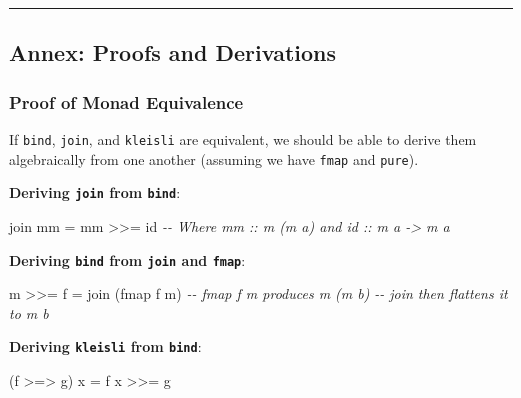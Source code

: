 \documentclass[
]{article}
\newenvironment{Shaded}{}{}
\newcommand{\CommentTok}[1]{\textcolor[rgb]{0.38,0.63,0.69}{\textit{#1}}}
\newcommand{\FunctionTok}[1]{\textcolor[rgb]{0.02,0.16,0.49}{#1}}
\newcommand{\NormalTok}[1]{#1}
\newcommand{\OperatorTok}[1]{\textcolor[rgb]{0.40,0.40,0.40}{#1}}
\newcommand{\OtherTok}[1]{\textcolor[rgb]{0.00,0.44,0.13}{#1}}
\begin{document}
\begin{center}\rule{0.5\linewidth}{0.5pt}\end{center}

\subsection{Annex: Proofs and
Derivations}\label{annex-proofs-and-derivations}

\subsubsection{Proof of Monad
Equivalence}\label{proof-of-monad-equivalence}

If \texttt{bind}, \texttt{join}, and \texttt{kleisli} are equivalent, we
should be able to derive them algebraically from one another (assuming
we have \texttt{fmap} and \texttt{pure}).

\textbf{Deriving \texttt{join} from \texttt{bind}}:

\begin{Shaded}
\begin{Highlighting}[]
\NormalTok{join mm }\OtherTok{=}\NormalTok{ mm }\OperatorTok{\textgreater{}\textgreater{}=} \FunctionTok{id}  
\CommentTok{{-}{-} Where mm :: m (m a) and id :: m a {-}\textgreater{} m a}
\end{Highlighting}
\end{Shaded}

\textbf{Deriving \texttt{bind} from \texttt{join} and \texttt{fmap}}:

\begin{Shaded}
\begin{Highlighting}[]
\NormalTok{m }\OperatorTok{\textgreater{}\textgreater{}=}\NormalTok{ f }\OtherTok{=}\NormalTok{ join (}\FunctionTok{fmap}\NormalTok{ f m)}
\CommentTok{{-}{-} fmap f m produces m (m b)}
\CommentTok{{-}{-} join then flattens it to m b}
\end{Highlighting}
\end{Shaded}

\textbf{Deriving \texttt{kleisli} from \texttt{bind}}:

\begin{Shaded}
\begin{Highlighting}[]
\NormalTok{(f }\OperatorTok{\textgreater{}=\textgreater{}}\NormalTok{ g) x }\OtherTok{=}\NormalTok{ f x }\OperatorTok{\textgreater{}\textgreater{}=}\NormalTok{ g}
\end{Highlighting}
\end{Shaded}
\end{document}
